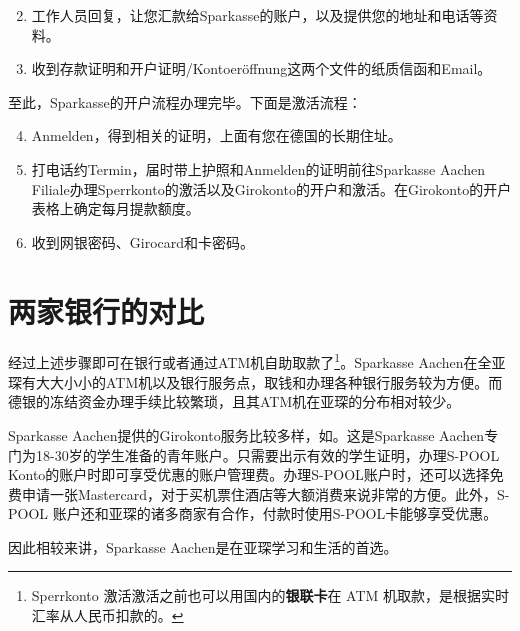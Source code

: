   \begin{enumerate}
    \setcounter{enumi}{1}
    \item 工作人员回复，让您汇款给Sparkasse的账户，以及提供您的地址和电话等资料。 
    \item 收到存款证明和开户证明/Kontoeröffnung这两个文件的纸质信函和Email。
  \end{enumerate}

  至此，Sparkasse的开户流程办理完毕。下面是激活流程：

  \begin{enumerate}
    \setcounter{enumi}{3}
    \item Anmelden，得到相关的证明，上面有您在德国的长期住址。
    \item 打电话约Termin，届时带上护照和Anmelden的证明前往Sparkasse Aachen Filiale办理Sperrkonto的激活以及Girokonto的开户和激活。在Girokonto的开户表格上确定每月提款额度。
    \item 收到网银密码、Girocard和卡密码。
  \end{enumerate}

\section{两家银行的对比}

  经过上述步骤即可在银行或者通过ATM机自助取款了\footnote{Sperrkonto 激活激活之前也可以用国内的\textbf{银联卡}在 ATM 机取款，是根据实时汇率从人民币扣款的。}。Sparkasse Aachen在全亚琛有大大小小的ATM机以及银行服务点，取钱和办理各种银行服务较为方便。而德银的冻结资金办理手续比较繁琐，且其ATM机在亚琛的分布相对较少。

  Sparkasse Aachen提供的Girokonto服务比较多样，如\href{https://www.sparkasse-aachen.de/de/home/privatkunden/girokonto/s-pool.html}{}。这是Sparkasse Aachen专门为18-30岁的学生准备的青年账户。只需要出示有效的学生证明，办理S-POOL Konto的账户时即可享受优惠的账户管理费。办理S-POOL账户时，还可以选择免费申请一张Mastercard，对于买机票住酒店等大额消费来说非常的方便。此外，S-POOL 账户还和亚琛的诸多商家有合作，付款时使用S-POOL卡能够享受优惠。

  因此相较来讲，Sparkasse Aachen是在亚琛学习和生活的首选。
